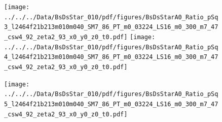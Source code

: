 \documentclass[a4paper,10pt]{article}
\begin{document}
\clearpage
\begin{figure}[p]
 \texttt{[image: ../../../Data/BsDsStar\_010/pdf/figures/BsDsStarA0\_Ratio\_pSq3\_l2464f21b213m010m040\_SM7\_86\_PT\_m0\_03224\_LS16\_m0\_300\_m7\_47\_csw4\_92\_zeta2\_93\_x0\_y0\_z0\_t0.pdf]} 
 \texttt{[image: ../../../Data/BsDsStar\_010/pdf/figures/BsDsStarA0\_Ratio\_pSq4\_l2464f21b213m010m040\_SM7\_86\_PT\_m0\_03224\_LS16\_m0\_300\_m7\_47\_csw4\_92\_zeta2\_93\_x0\_y0\_z0\_t0.pdf]} 
 \end{figure}
\begin{figure}[p]
 \texttt{[image: ../../../Data/BsDsStar\_010/pdf/figures/BsDsStarA0\_Ratio\_pSq5\_l2464f21b213m010m040\_SM7\_86\_PT\_m0\_03224\_LS16\_m0\_300\_m7\_47\_csw4\_92\_zeta2\_93\_x0\_y0\_z0\_t0.pdf]} 
 \end{figure}
\clearpage
\end{document}
